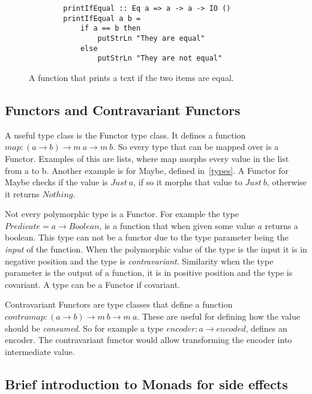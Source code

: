 \begin{figure}[H]
    \begin{lstlisting}
        printIfEqual :: Eq a => a -> a -> IO ()
        printIfEqual a b =
            if a == b then
                putStrLn "They are equal"
            else
                putStrLn "They are not equal"
    \end{lstlisting}
    \caption{A function that prints a text if the two items are equal.}
    \label{printifequal}
\end{figure}



\subsection{Functors and Contravariant Functors}

A useful type class is the Functor type class. It defines a function 
$map : (a\rightarrow b) \rightarrow m\ a \rightarrow m\ b$. So every type that
can be mapped over is a Functor. Examples of this are lists, where map morphs
every value in the list from a to b. Another example is for Maybe, defined
in~\ref{types}. A Functor for Maybe checks if the value is $Just\ a$, if so it
morphs that value to $Just\ b$, otherwise it returns $Nothing$. 

Not every polymorphic type is a Functor. For example the type $Predicate = a
\rightarrow Boolean$, is a function that when given some value $a$ returns a
boolean. This type can not be a functor due to the type parameter being the
\textit{input} of the function. When the polymorphic value of the type is the
input it is in negative position and the type is \textit{contravariant}. Similarity when the
type parameter is the output of a function, it is in positive position and
the type is covariant. A type can be a Functor if covariant.

Contravariant Functors are type classes that define a function $contramap :
(a\rightarrow b) \rightarrow m\ b \rightarrow m\ a$. These are useful for
defining how the value should be \textit{consumed}. So for example a type
$encoder : a\rightarrow encoded$, defines an encoder. The contravariant functor
would allow transforming the encoder into intermediate value.

\subsection{Brief introduction to Monads for side effects}\label{monads}

